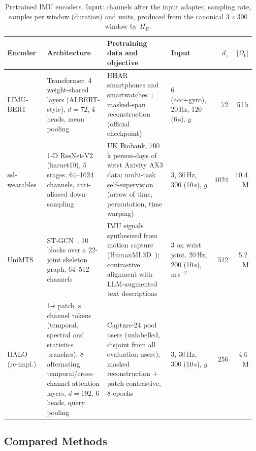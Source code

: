 \begin{table}[!t]
\centering
\caption{Pretrained IMU encoders. Input: channels after the input adapter, sampling rate, samples
per window (duration) and units, produced from the canonical $3\times300$ window by $\Pi_E$.}
\label{tab:encoders}
\footnotesize
\setlength{\tabcolsep}{4pt}
\renewcommand{\arraystretch}{1.15}
\begin{tabularx}{\textwidth}{@{}l Y Y l r r@{}}
\toprule
Encoder & Architecture & Pretraining data and objective & Input & $d_z$ & $|\Omega_0|$ \\
\midrule
LIMU-BERT~\cite{xu2021limubert} &
  Transformer, 4 weight-shared layers (ALBERT-style), $d=72$, 4 heads, mean pooling &
  HHAR smartphones and smartwatches~\cite{stisen2015smart}; masked-span reconstruction (official checkpoint) &
  6 (acc+gyro), 20\,Hz, 120 (6\,s), $g$ & 72 & 51\,k \\
ssl-wearables~\cite{yuan2024selfsupervised} &
  1-D ResNet-V2 (harnet10), 5 stages, 64--1024 channels, anti-aliased down-sampling &
  UK Biobank, 700\,k person-days of wrist Axivity AX3 data; multi-task self-supervision (arrow of
  time, permutation, time warping) &
  3, 30\,Hz, 300 (10\,s), $g$ & 1024 & 10.4\,M \\
UniMTS~\cite{zhang2024unimts} &
  ST-GCN~\cite{yan2018spatial}, 10 blocks over a 22-joint skeleton graph, 64--512 channels &
  IMU signals synthesized from motion capture (HumanML3D~\cite{guo2022generating}); contrastive
  alignment with LLM-augmented text descriptions &
  3 on wrist joint, 20\,Hz, 200 (10\,s), m\,s$^{-2}$ & 512 & 5.2\,M \\
HALO~\cite{ding2026halo} (re-impl.) &
  1-s patch $\times$ channel tokens (temporal, spectral and statistics branches), 8 alternating
  temporal/cross-channel attention layers, $d=192$, 6 heads, query pooling &
  Capture-24 pool users (unlabelled, disjoint from all evaluation users); masked reconstruction +
  patch contrastive, 8 epochs &
  3, 30\,Hz, 300 (10\,s), $g$ & 256 & 4.6\,M \\
\bottomrule
\end{tabularx}
\end{table}

\subsection{Compared Methods}\label{sec:data:methods}

